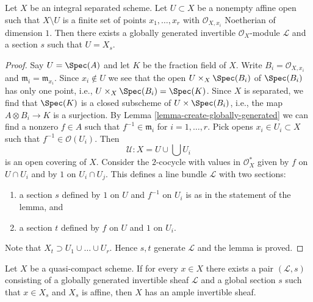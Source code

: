 \begin{lemma}
\label{lemma-find-globally-generated}
Let $X$ be an integral separated scheme. Let $U \subset X$ be a nonempty
affine open such that $X \setminus U$ is a finite set of points
$x_1, \ldots, x_r$ with $\mathcal{O}_{X, x_i}$ Noetherian of dimension $1$.
Then there exists a globally generated invertible $\mathcal{O}_X$-module
$\mathcal{L}$ and a section $s$ such that $U = X_s$.
\end{lemma}

\begin{proof}
Say $U = \Spec(A)$ and let $K$ be the fraction field of $X$.
Write $B_i = \mathcal{O}_{X, x_i}$ and $\mathfrak m_i = \mathfrak m_{x_i}$.
Since $x_i \not \in U$ we see that the open
$U \times_X \Spec(B_i)$ of $\Spec(B_i)$ has only one point, i.e.,
$U \times_X \Spec(B_i) = \Spec(K)$.
Since $X$ is separated, we find that $\Spec(K)$ is a closed subscheme
of $U \times \Spec(B_i)$, i.e., the map $A \otimes B_i \to K$ is a surjection.
By Lemma \ref{lemma-create-globally-generated} we can find a nonzero
$f \in A$ such that $f^{-1} \in \mathfrak m_i$ for $i = 1, \ldots, r$.
Pick opens $x_i \in U_i \subset X$ such that $f^{-1} \in \mathcal{O}(U_i)$.
Then
$$
\mathcal{U} : X = U \cup \bigcup U_i
$$
is an open covering of $X$. Consider the $2$-cocycle with values
in $\mathcal{O}_X^*$ given by $f$ on $U \cap U_i$ and by
$1$ on $U_i \cap U_j$. This defines a line bundle $\mathcal{L}$
with two sections:
\begin{enumerate}
\item a section $s$ defined by $1$ on $U$
and $f^{-1}$ on $U_i$ is as in the statement of the lemma, and
\item a section $t$ defined by $f$ on $U$ and
$1$ on $U_i$.
\end{enumerate}
Note that $X_t \supset U_1 \cup \ldots \cup U_r$.
Hence $s, t$ generate $\mathcal{L}$ and the lemma is proved.
\end{proof}

\begin{lemma}
\label{lemma-enough-globally-generated-ample}
Let $X$ be a quasi-compact scheme. If for every $x \in X$
there exists a pair $(\mathcal{L}, s)$ consisting of a globally generated
invertible sheaf $\mathcal{L}$ and a global section $s$ such that
$x \in X_s$ and $X_s$ is affine, then $X$ has an ample invertible
sheaf.
\end{lemma}

